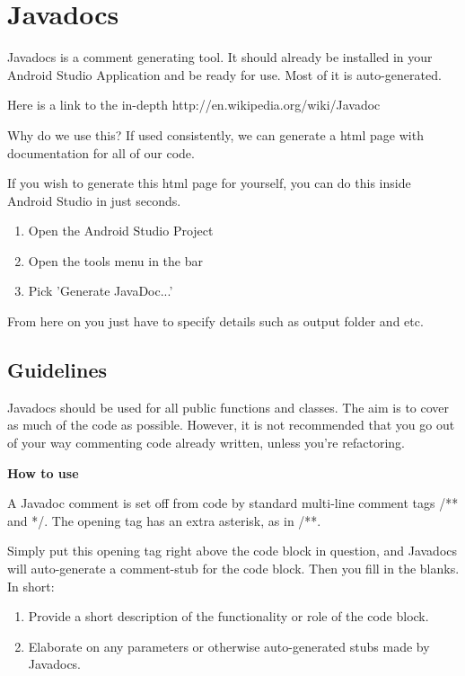 \section{Javadocs}
Javadocs is a comment generating tool. It should already be installed in your Android Studio Application and be ready for use. Most of it is auto-generated.

Here is a link to the in-depth http://en.wikipedia.org/wiki/Javadoc

Why do we use this? If used consistently, we can generate a html page with documentation for all of our code.

If you wish to generate this html page for yourself, you can do this inside Android Studio in just seconds.

\begin{enumerate}
	\item Open the Android Studio Project
	\item Open the tools menu in the bar
	\item Pick 'Generate JavaDoc...'
\end{enumerate}

From here on you just have to specify details such as output folder and etc.

\subsection{Guidelines}
Javadocs should be used for all public functions and classes. The aim is to cover as much of the code as possible. However, it is not recommended that you go out of your way commenting code already written, unless you're refactoring.

\textbf{How to use}

A Javadoc comment is set off from code by standard multi-line comment tags /** and */. The opening tag has an extra asterisk, as in /**.

Simply put this opening tag right above the code block in question, and Javadocs will auto-generate a comment-stub for the code block. Then you fill in the blanks.
In short:

\begin{enumerate}
	\item Provide a short description of the functionality or role of the code block.
	\item Elaborate on any parameters or otherwise auto-generated stubs made by Javadocs.
\end{enumerate}

